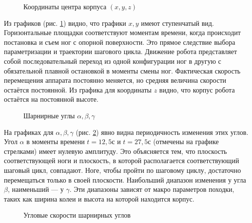 \newpage
\begin{figure}[t]
\caption{Координаты центра корпуса $(x,y,z)$}
\label{fig:exper1coord}
\end{figure}

Из графиков (рис. \ref{fig:exper1coord}) видно, что графики $x, y$ имеют ступенчатый вид. Горизонтальные площадки соответствуют моментам времени, когда происходит постановка и съем ног с опорной поверхности. Это прямое следствие выбора параметризации и траектории шагового цикла. Движение робота представляет собой последовательный переход из одной конфигурации ног в другую с обязательной плавной остановкой в моменты смены ног. Фактическая скорость перемещения аппарата постоянно меняется, но средняя величина скорости остаётся постоянной. Из графика для координаты $z$ видно, что корпус робота остаётся на постоянной высоте.

\newpage
\begin{figure}[t]
\caption{Шарнирные углы $\alpha, \beta, \gamma$}
\label{fig:exper1coord2}
\end{figure}

На графиках для $\alpha, \beta, \gamma$ (рис. \ref{fig:exper1coord2}) явно видна периодичность изменения этих углов. Угол $\alpha$ в моменты времени $t=12,5$с и $t=27,5$с (отмечены на графике стрелками) имеет нулевую амплитуду. Это объясняется тем, что плоскость соответствующей ноги и плоскость, в которой располагается соответствующий шаговый цикл, совпадают. Ноге, чтобы пройти по шаговому циклу, достаточно перемещаться только в своей плоскости. Наибольший диапазон изменения у угла $\beta$, наименьший --- у $\gamma$. Эти диапазоны зависят от макро параметров походки, таких как ширина колеи и высота на которой находится корпус. 

\newpage
\begin{figure}[t]
\caption{Угловые скорости шарнирных углов}
\end{figure}

